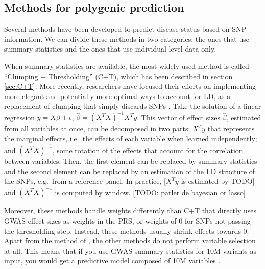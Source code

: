 \subsection{Methods for polygenic prediction}

Several methods have been developed to predict disease status based on SNP information.
We can divide these methods in two categories: the ones that use summary statistics and the ones that use individual-level data only.

When summary statistics are available, the most widely used method is called ``Clumping + Thresholding'' (C+T), which has been described in section \ref{sec:C+T}.
More recently, researchers have focused their efforts on implementing more elegant and potentially more optimal ways to account for LD, as a replacement of clumping that simply discards SNPs \cite[]{vilhjalmsson2015modeling,mak2017polygenic,chun2019non,ge2019polygenic}. 
Take the solution of a linear regression $y = X \beta + \epsilon$, $\hat{\beta} = \left(X^T X\right)^{-1} X^T y$. This vector of effect sizes $\hat{\beta}$, estimated from all variables at once, can be decomposed in two parts: $X^T y$ that represents the marginal effects, i.e.\ the effects of each variable when learned independently; and $\left(X^T X\right)^{-1}$, some rotation of the effects that account for the correlation between variables.
Then, the first element can be replaced by summary statistics and the second element can be replaced by an estimation of the LD structure of the SNPs, e.g.\ from a reference panel. 
In practice, [$X^T y$ is estimated by TODO] and $\left(X^T X\right)^{-1}$ is computed by window. [TODO: parler de bayesian or lasso]


Moreover, these methods handle weights differently than C+T that directly uses GWAS effect sizes as weights in the PRS, or weights of 0 for SNPs not passing the thresholding step. Instead, these methods usually shrink effects towards 0. 
Apart from the method of \cite{mak2017polygenic}, the other methods do not perform variable selection at all. This means that if you use GWAS summary statistics for 10M variants as input, you would get a predictive model composed of 10M variables \cite[]{janssens2019polygenic}.

